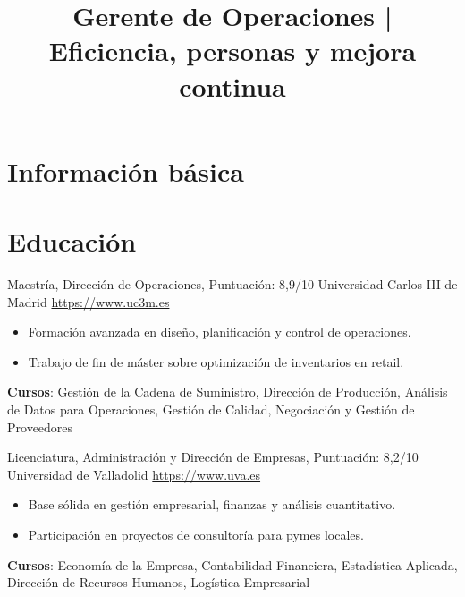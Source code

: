 \documentclass[a4paper, serif, 10pt]{moderncv}
\title{Gerente de Operaciones | Eficiencia, personas y mejora continua}
\begin{document}
\maketitle

\section{Información básica}

\section{Educación}

        {Maestría, Dirección de Operaciones, Puntuación: 8,9/10}
        {Universidad Carlos III de Madrid}
        {\url{https://www.uc3m.es}}
        {}
        {\begin{itemize}
\item Formación avanzada en diseño, planificación y control de operaciones.
\item Trabajo de fin de máster sobre optimización de inventarios en retail.
\end{itemize}
\textbf{Cursos}: Gestión de la Cadena de Suministro, Dirección de Producción, Análisis de Datos para Operaciones, Gestión de Calidad, Negociación y Gestión de Proveedores}

        {Licenciatura, Administración y Dirección de Empresas, Puntuación: 8,2/10}
        {Universidad de Valladolid}
        {\url{https://www.uva.es}}
        {}
        {\begin{itemize}
\item Base sólida en gestión empresarial, finanzas y análisis cuantitativo.
\item Participación en proyectos de consultoría para pymes locales.
\end{itemize}
\textbf{Cursos}: Economía de la Empresa, Contabilidad Financiera, Estadística Aplicada, Dirección de Recursos Humanos, Logística Empresarial}
\end{document}
